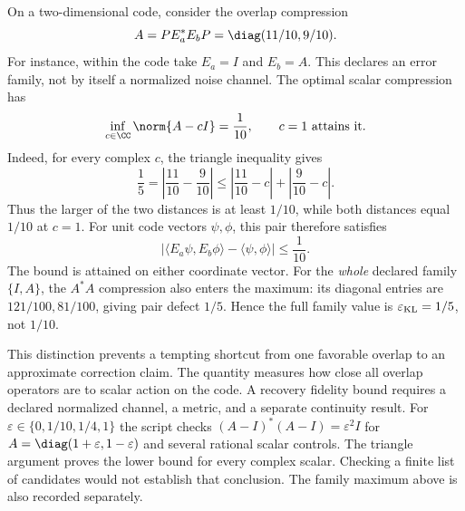 On a two-dimensional code, consider the overlap compression
\[
A=PE_a^*E_bP=\diag(11/10,9/10).
\]
For instance, within the code take $E_a=I$ and $E_b=A$. This declares an error family, not by itself a normalized noise channel. The optimal scalar compression has
\[
\inf_{c\in\CC}\norm{A-cI}=\frac1{10},\qquad c=1\ \text{attains it}.
\]
Indeed, for every complex $c$, the triangle inequality gives
\[
\frac15=\left|\frac{11}{10}-\frac9{10}\right|
\leq\left|\frac{11}{10}-c\right|+\left|\frac9{10}-c\right|.
\]
Thus the larger of the two distances is at least $1/10$, while both distances equal $1/10$ at $c=1$.
For unit code vectors $\psi,\phi$, this pair therefore satisfies
\[
\left|\langle E_a\psi,E_b\phi\rangle-\langle\psi,\phi\rangle\right|
\leq\frac1{10}.
\]
The bound is attained on either coordinate vector. For the \emph{whole} declared family $\{I,A\}$, the $A^*A$ compression also enters the maximum: its diagonal entries are $121/100,81/100$, giving pair defect $1/5$. Hence the full family value is $\varepsilon_{\rm KL}=1/5$, not $1/10$.

This distinction prevents a tempting shortcut from one favorable overlap to an approximate correction claim. The quantity measures how close all overlap operators are to scalar action on the code. A recovery fidelity bound requires a declared normalized channel, a metric, and a separate continuity result.
For $\varepsilon\in\{0,1/10,1/4,1\}$ the script checks $(A-I)^*(A-I)=\varepsilon^2I$ for $A=\diag(1+\varepsilon,1-\varepsilon)$ and several rational scalar controls. The triangle argument proves the lower bound for every complex scalar. Checking a finite list of candidates would not establish that conclusion. The family maximum above is also recorded separately.

